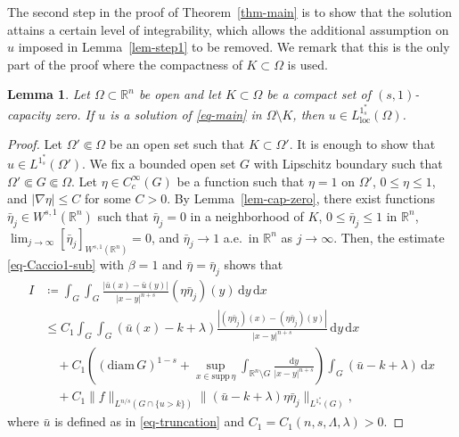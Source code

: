 \documentclass{amsart}
\theoremstyle{plain}
\newtheorem{lemma}[theorem]{Lemma}
\theoremstyle{definition}
\numberwithin{equation}{section}
\begin{document}
The second step in the proof of Theorem~\ref{thm-main} is to show that the solution attains a certain level of integrability, which allows the additional assumption on $u$ imposed in Lemma~\ref{lem-step1} to be removed. We remark that this is the only part of the proof where the compactness of $K \subset \Omega$ is used.

\begin{lemma}\label{lem-step2}
Let $\Omega \subset \mathbb{R}^n$ be open and let $K \subset \Omega$ be a compact set of $(s, 1)$-capacity zero. If $u$ is a solution of \eqref{eq-main} in $\Omega \setminus K$, then $u \in L^{1^{\ast}_s}_{\mathrm{loc}}(\Omega)$.
\end{lemma}


\begin{proof}
Let $\Omega' \Subset \Omega$ be an open set such that $K \subset \Omega'$. It is enough to show that $u \in L^{1^{\ast}_s}(\Omega')$. We fix a bounded open set $G$ with Lipschitz boundary such that $\Omega' \Subset G \Subset \Omega$. Let $\eta \in C^\infty_c(G)$ be a function such that $\eta =1$ on $\Omega'$, $0 \leq \eta \leq 1$, and $|\nabla \eta| \leq C$ for some $C>0$. By Lemma~\ref{lem-cap-zero}, there exist functions $\bar{\eta}_j \in W^{s, 1}(\mathbb{R}^n)$ such that $\bar{\eta}_j=0$ in a neighborhood of $K$, $0 \leq \bar{\eta}_j \leq 1$ in $\mathbb{R}^n$, $\lim_{j\to \infty} [\bar{\eta}_j]_{W^{s,1}(\mathbb{R}^n)} = 0$, and $\bar{\eta}_j \to 1$ a.e.\ in $\mathbb{R}^n$ as $j \to \infty$. Then, the estimate \eqref{eq-Caccio1-sub} with $\beta=1$ and $\bar{\eta}=\bar{\eta}_j$ shows that
\begin{align*}
I
&\coloneqq \int_{G} \int_{G} \frac{|\bar{u}(x) - \bar{u}(y)|}{|x-y|^{n+s}} (\eta\bar{\eta}_j)(y) \,\mathrm{d}y \,\mathrm{d}x \\
&\leq C_1 \int_{G} \int_{G} (\bar{u}(x)-k+\lambda) \frac{|(\eta\bar{\eta}_j)(x)-(\eta\bar{\eta}_j)(y)|}{|x-y|^{n+s}} \,\mathrm{d}y \,\mathrm{d}x \\
&\quad + C_1 \left( (\mathrm{diam}\, G)^{1-s} + \sup_{x \in \mathrm{supp}\,\eta} \int_{\mathbb{R}^n \setminus G} \frac{\mathrm{d}y}{|x-y|^{n+s}} \right) \int_{G} (\bar{u}-k+\lambda) \,\mathrm{d}x \\
&\quad + C_1 \|f\|_{L^{n/s}(G \cap \{u>k\})} \|(\bar{u}-k+\lambda)\eta\bar{\eta}_j\|_{L^{1^{\ast}_s}(G)},
\end{align*}
where $\bar{u}$ is defined as in \eqref{eq-truncation} and $C_1=C_1(n, s, \Lambda, \lambda)>0$.


\end{proof}
\end{document}
